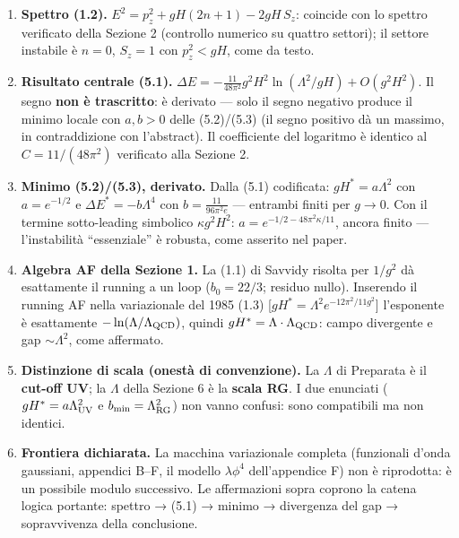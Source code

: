\documentclass[
]{article}
\providecommand{\tightlist}{%
  \setlength{\itemsep}{0pt}\setlength{\parskip}{0pt}}
\begin{document}
\begin{enumerate}
\def\labelenumi{\arabic{enumi}.}
\tightlist
\item
  \textbf{Spettro (1.2).} \(E^2 = p_z^2 + gH(2n+1) - 2gH\,S_z\):
  coincide con lo spettro verificato della Sezione 2 (controllo numerico
  su quattro settori); il settore instabile è \(n=0\), \(S_z=1\) con
  \(p_z^2 < gH\), come da testo.
\item
  \textbf{Risultato centrale (5.1).}
  \(\Delta E = -\frac{11}{48\pi^2}g^2H^2\ln(\Lambda^2/gH) + O(g^2H^2)\).
  Il segno \textbf{non è trascritto}: è derivato --- solo il segno
  negativo produce il minimo locale con \(a, b > 0\) delle (5.2)/(5.3)
  (il segno positivo dà un massimo, in contraddizione con l'abstract).
  Il coefficiente del logaritmo è identico al \(C = 11/(48\pi^2)\)
  verificato alla Sezione 2.
\item
  \textbf{Minimo (5.2)/(5.3), derivato.} Dalla (5.1) codificata:
  \(gH^* = a\Lambda^2\) con \(a = e^{-1/2}\) e
  \(\Delta E^* = -b\Lambda^4\) con \(b = \frac{11}{96\pi^2 e}\) ---
  entrambi finiti per \(g \to 0\). Con il termine sotto-leading
  simbolico \(\kappa g^2H^2\): \(a = e^{-1/2 - 48\pi^2\kappa/11}\),
  ancora finito --- l'instabilità ``essenziale'' è robusta, come
  asserito nel paper.
\item
  \textbf{Algebra AF della Sezione 1.} La (1.1) di Savvidy risolta per
  \(1/g^2\) dà esattamente il running a un loop (\(b_0 = 22/3\); residuo
  nullo). Inserendo il running AF nella variazionale del 1985 (1.3)
  {[}\(gH^* = \Lambda^2 e^{-12\pi^2/11g^2}\){]} l'esponente è
  esattamente \(-\ln(\Lambda/\Lambda_{\rm QCD})\), quindi
  \(gH^* = \Lambda\cdot\Lambda_{\rm QCD}\): campo divergente e gap
  \(\sim\Lambda^2\), come affermato.
\item
  \textbf{Distinzione di scala (onestà di convenzione).} La \(\Lambda\)
  di Preparata è il \textbf{cut-off UV}; la \(\Lambda\) della Sezione 6
  è la \textbf{scala RG}. I due enunciati
  (\(gH^* = a\Lambda_{\rm UV}^2\) e \(b_{\min} = \Lambda_{\rm RG}^2\))
  non vanno confusi: sono compatibili ma non identici.
\item
  \textbf{Frontiera dichiarata.} La macchina variazionale completa
  (funzionali d'onda gaussiani, appendici B--F, il modello
  \(\lambda\phi^4\) dell'appendice F) non è riprodotta: è un possibile
  modulo successivo. Le affermazioni sopra coprono la catena logica
  portante: spettro → (5.1) → minimo → divergenza del gap →
  sopravvivenza della conclusione.
\end{enumerate}
\end{document}
